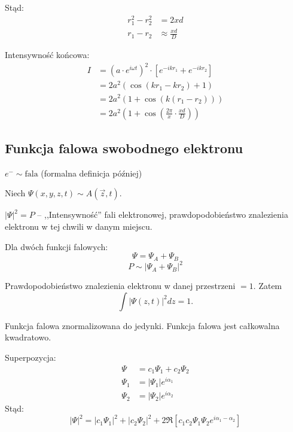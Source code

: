 Stąd:
\begin{align*}
    r_1^2 - r_2^2 &= 2xd\\
    r_1 - r_2 &\approx \frac{xd}{D}
\end{align*}

Intensywność końcowa:
\begin{align*}
    I &= \left(a\cdot e^{i\omega t}\right)^2 \cdot \left[e^{-ikr_1}+e^{-ikr_2}\right] \\
    &= 2 a^2 \left(\cos{\left(kr_1-kr_2\right)}+1\right) \\
    &= 2 a^2 \left(1 + \cos{\left(k(r_1-r_2)\right)}\right) \\
    &= 2 a^2 \left(1 + \cos{\left(\frac{2\pi}{x}\cdot\frac{xd}{D}\right)}\right)
\end{align*}

\subsection{Funkcja falowa swobodnego elektronu}

$e^- \sim \text{fala}$ (formalna definicja później)

Niech $\Psi(x,y,z,t) \sim A(\vec{z}, t)$.  

$|\Psi|^2 = P$ -- ,,Intensywność'' fali elektronowej, prawdopodobieństwo znalezienia elektronu w tej chwili w danym miejscu.

Dla dwóch funkcji falowych:
\begin{equation*}
    \Psi = \Psi_A + \Psi_B
\end{equation*}
\begin{equation*}
    P \sim |\Psi_A + \Psi_B|^2
\end{equation*}

Prawdopodobieństwo znalezienia elektronu w danej przestrzeni $= 1$. Zatem
\begin{equation*}
    \int |\Psi(z,t)|^2 dz = 1.
\end{equation*}

Funkcja falowa znormalizowana do jedynki. Funkcja falowa jest całkowalna kwadratowo.

Superpozycja:
\begin{align*}
    \Psi &= c_1 \Psi_1 + c_2 \Psi_2 \\
    \Psi_1 &= |\Psi_1| e^{i \alpha_1} \\
    \Psi_2 &= |\Psi_2| e^{i \alpha_2}
\end{align*}
Stąd:
\begin{equation*}
    |\Psi|^2 = |c_1 \Psi_1|^2 + |c_2 \Psi_2|^2 + 2 \Re \left[ c_1 c_2 \Psi_1 \Psi_2 e^{i \alpha_1 - \alpha_2} \right]
\end{equation*}
